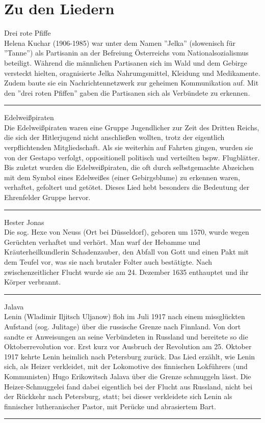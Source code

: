 \section*{Zu den Liedern}


Drei rote Pfiffe\\[+0.2em]
Helena Kuchar (1906-1985) war unter dem Namen ''Jelka'' (slowenisch für ''Tanne'') als Partisanin an der Befreiung Österreichs vom Nationalsozialismus beteiligt.
Während die männlichen Partisanen sich im Wald und dem Gebirge versteckt hielten, oragnisierte Jelka Nahrumgsmittel, Kleidung und Medikamente.
Zudem baute sie ein Nachrichtennetzwerk zur geheimen Kommunikation auf. Mit den ''drei roten Pfiffen'' gaben die Partisanen sich als Verbündete zu erkennen.\\
\noindent\rule{\textwidth}{0.3pt}\vspace{0.5em}

Edelweißpiraten\\[+0.2em]
Die Edelweißpiraten waren eine Gruppe Jugendlicher zur Zeit des Dritten Reichs, die sich der Hitlerjugend nicht anschließen wollten, trotz der eigentlich verpflichtenden Mitgliedschaft.
Als sie weiterhin auf Fahrten gingen, wurden sie von der Gestapo verfolgt, oppositionell politisch und verteilten bspw. Flugblätter.
Bis zuletzt wurden die Edelweißpiraten, die oft durch selbstgemachte Abzeichen mit dem Symbol eines Edelweißes (einer Gebirgsblume) zu erkennen waren, verhaftet, gefoltert und getötet.
Dieses Lied hebt besonders die Bedeutung der Ehrenfelder Gruppe hervor.\\
\noindent\rule{\textwidth}{0.3pt}\vspace{0.5em}

Hester Jonas\\[+0.2em]
Die sog. Hexe von Neuss (Ort bei Düsseldorf), geboren um 1570, wurde wegen Gerüchten verhaftet und verhört.
Man warf der Hebamme und Kräuterheilkundlerin Schadenzauber, den Abfall von Gott und einen Pakt mit dem Teufel vor, was sie nach brutaler Folter auch bestätigte.
Nach zwischenzeitlicher Flucht wurde sie am 24. Dezember 1635 enthauptet und ihr Körper verbrannt.\\
\noindent\rule{\textwidth}{0.3pt}\vspace{0.5em}

Jalava\\[+0.2em]
Lenin (Wladimir Iljitsch Uljanow) floh im Juli 1917 nach einem missglückten Aufstand (sog. Julitage) über die russische Grenze nach Finnland.
Von dort sandte er Anweisungen an seine Verbündeten in Russland und bereitete so die Oktoberrevolution vor.
Erst kurz vor Ausbruch der Revolution am 25. Oktober 1917 kehrte Lenin heimlich nach Petersburg zurück.
Das Lied erzählt, wie Lenin sich, als Heizer verkleidet, mit der Lokomotive des finnischen Lokführers (und Kommunisten) Hugo Erikowitsch Jalava über die Grenze schmuggeln lässt.
Die Heizer-Schmuggelei fand dabei eigentlich bei der Flucht aus Russland, nicht bei der Rückkehr nach Petersburg, statt; bei dieser verkleidete sich Lenin als finnischer lutheranischer Pastor, mit Perücke und abrasiertem Bart.\\
\noindent\rule{\textwidth}{0.3pt}\vspace{0.5em}

